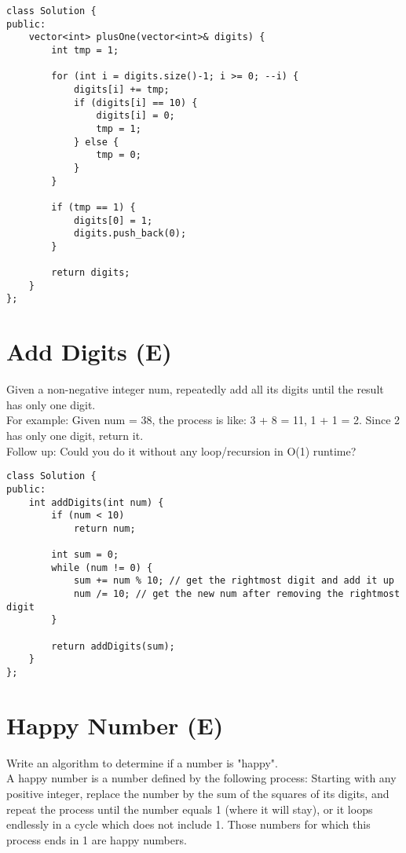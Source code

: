 \begin{lstlisting}
class Solution {
public:
    vector<int> plusOne(vector<int>& digits) {
        int tmp = 1;
        
        for (int i = digits.size()-1; i >= 0; --i) {
            digits[i] += tmp;
            if (digits[i] == 10) {
                digits[i] = 0;
                tmp = 1;
            } else {
                tmp = 0;
            }
        }
        
        if (tmp == 1) {
            digits[0] = 1;
            digits.push_back(0);
        }
        
        return digits;
    }
};
\end{lstlisting}


\section{Add Digits (E)}
Given a non-negative integer num, repeatedly add all its digits until the result has only one digit.\\

For example:
Given num = 38, the process is like: 3 + 8 = 11, 1 + 1 = 2. Since 2 has only one digit, return it.\\

Follow up:
Could you do it without any loop/recursion in O(1) runtime? \\

\begin{lstlisting}
class Solution {
public:
    int addDigits(int num) {
        if (num < 10)
            return num;
        
        int sum = 0;
        while (num != 0) {
            sum += num % 10; // get the rightmost digit and add it up
            num /= 10; // get the new num after removing the rightmost digit
        }
        
        return addDigits(sum);
    }
};
\end{lstlisting}


\section{Happy Number (E)}
Write an algorithm to determine if a number is "happy".\\

A happy number is a number defined by the following process: Starting with any positive integer, replace the number by the sum of the squares of its digits, and repeat the process until the number equals 1 (where it will stay), or it loops endlessly in a cycle which does not include 1. Those numbers for which this process ends in 1 are happy numbers.\\

